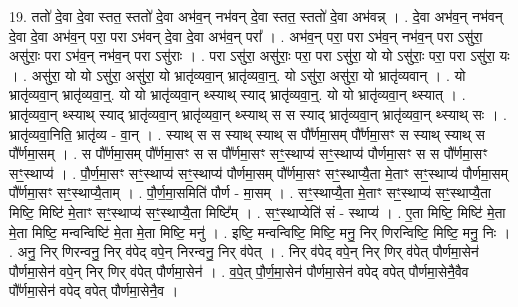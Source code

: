 \documentclass[17pt]{extarticle}
\begin{document}
19. ततो॑ दे॒वा दे॒वा स्तत॒ स्ततो॑ दे॒वा अभ॑व॒न् नभ॑वन् दे॒वा स्तत॒ स्ततो॑ दे॒वा अभ॑वन्न् । . दे॒वा अभ॑व॒न् नभ॑वन् दे॒वा दे॒वा अभ॑व॒न् परा॒ परा ऽभ॑वन् दे॒वा दे॒वा अभ॑व॒न् परा᳚ । . अभ॑व॒न् परा॒ परा ऽभ॑व॒न् नभ॑व॒न् परा ऽसु॑रा॒ असु॑राः॒ परा ऽभ॑व॒न् नभ॑व॒न् परा ऽसु॑राः । . परा ऽसु॑रा॒ असु॑राः॒ परा॒ परा ऽसु॑रा॒ यो यो ऽसु॑राः॒ परा॒ परा ऽसु॑रा॒ यः । . असु॑रा॒ यो यो ऽसु॑रा॒ असु॑रा॒ यो भ्रातृ॑व्यवा॒न् भ्रातृ॑व्यवा॒न्॒. यो ऽसु॑रा॒ असु॑रा॒ यो भ्रातृ॑व्यवान् । . यो भ्रातृ॑व्यवा॒न् भ्रातृ॑व्यवा॒न्॒. यो यो भ्रातृ॑व्यवा॒न् थ्स्याथ् स्याद् भ्रातृ॑व्यवा॒न्॒. यो यो भ्रातृ॑व्यवा॒न् थ्स्यात् । . भ्रातृ॑व्यवा॒न् थ्स्याथ् स्याद् भ्रातृ॑व्यवा॒न् भ्रातृ॑व्यवा॒न् थ्स्याथ् स स स्याद् भ्रातृ॑व्यवा॒न् भ्रातृ॑व्यवा॒न् थ्स्याथ् सः । . भ्रातृ॑व्यवा॒निति॒ भ्रातृ॑व्य - वा॒न् । . स्याथ् स स स्याथ् स्याथ् स पौ᳚र्णमा॒सम् पौ᳚र्णमा॒सꣳ स स्याथ् स्याथ् स पौ᳚र्णमा॒सम् । . स पौ᳚र्णमा॒सम् पौ᳚र्णमा॒सꣳ स स पौ᳚र्णमा॒सꣳ सꣳ॒॒स्थाप्य॑ सꣳ॒॒स्थाप्य॑ पौर्णमा॒सꣳ स स पौ᳚र्णमा॒सꣳ सꣳ॒॒स्थाप्य॑ । . पौ॒र्ण॒मा॒सꣳ सꣳ॒॒स्थाप्य॑ सꣳ॒॒स्थाप्य॑ पौर्णमा॒सम् पौ᳚र्णमा॒सꣳ सꣳ॒॒स्थाप्यै॒ता मे॒ताꣳ सꣳ॒॒स्थाप्य॑ पौर्णमा॒सम् पौ᳚र्णमा॒सꣳ सꣳ॒॒स्थाप्यै॒ताम् । . पौ॒र्ण॒मा॒समिति॑ पौर्ण - मा॒सम् । . सꣳ॒॒स्थाप्यै॒ता मे॒ताꣳ सꣳ॒॒स्थाप्य॑ सꣳ॒॒स्थाप्यै॒ता मिष्टि॒ मिष्टि॑ मे॒ताꣳ सꣳ॒॒स्थाप्य॑ सꣳ॒॒स्थाप्यै॒ता मिष्टि᳚म् । . सꣳ॒॒स्थाप्येति॑ सं - स्थाप्य॑ । . ए॒ता मिष्टि॒ मिष्टि॑ मे॒ता मे॒ता मिष्टि॒ मन्वन्विष्टि॑ मे॒ता मे॒ता मिष्टि॒ मनु॑ । . इष्टि॒ मन्वन्विष्टि॒ मिष्टि॒ मनु॒ निर् णिरन्विष्टि॒ मिष्टि॒ मनु॒ निः । . अनु॒ निर् णिरन्वनु॒ निर् व॑पेद् वपे॒न् निरन्वनु॒ निर् व॑पेत् । . निर् व॑पेद् वपे॒न् निर् णिर् व॑पेत् पौर्णमा॒सेन॑ पौर्णमा॒सेन॑ वपे॒न् निर् णिर् व॑पेत् पौर्णमा॒सेन॑ । . व॒पे॒त् पौ॒र्ण॒मा॒सेन॑ पौर्णमा॒सेन॑ वपेद् वपेत् पौर्णमा॒सेनै॒वैव पौ᳚र्णमा॒सेन॑ वपेद् वपेत् पौर्णमा॒सेनै॒व । \newline
\end{document}
